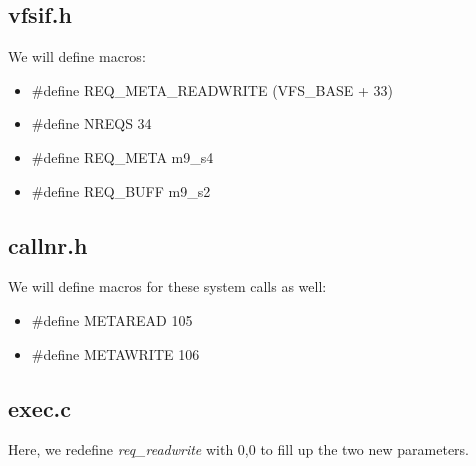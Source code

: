 \documentclass[paper=a4, fontsize=11pt]{scrartcl}
\numberwithin{equation}{section} %
\numberwithin{figure}{section} %
\numberwithin{table}{section} %
\begin{document}
	\subsection{vfsif.h}
	We will define macros:
	\begin{itemize}
	\item \#define REQ\_META\_READWRITE (VFS\_BASE + 33)
	\item \#define NREQS 34
	\item \#define REQ\_META m9\_s4
	\item \#define REQ\_BUFF m9\_s2
	\end{itemize}
	
	\subsection{callnr.h}
	We will define macros for these system calls as well:
		\begin{itemize}
			\item \#define METAREAD 105
			\item \#define METAWRITE 106
		\end{itemize}
	
	\subsection{exec.c}
	Here, we redefine {\it req\_readwrite}  with 0,0 to fill up the two new parameters.
\end{document}
